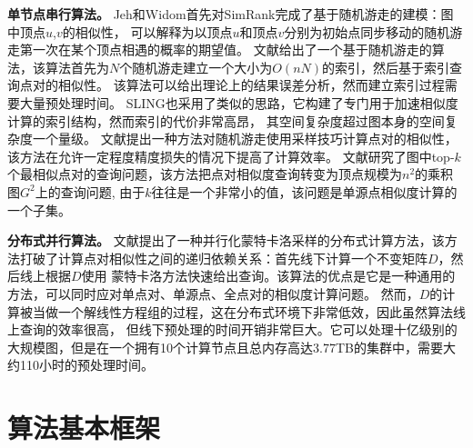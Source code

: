 \documentclass[master]{njuthesis}
\begin{document}
\textbf{单节点串行算法。 }Jeh和Widom\cite{jeh2002simrank}首先对SimRank完成了基于随机游走的建模：图中顶点$u$,$v$的相似性，
可以解释为以顶点$u$和顶点$v$分别为初始点同步移动的随机游走第一次在某个顶点相遇的概率的期望值。
文献\cite{fogaras2005scaling}给出了一个基于随机游走的算法，该算法首先为$N$个随机游走建立一个大小为$O(nN)$的索引，然后基于索引查询点对的相似性。
该算法可以给出理论上的结果误差分析，然而建立索引过程需要大量预处理时间。
SLING\cite{DBLP:conf/sigmod/TianX16}也采用了类似的思路，它构建了专门用于加速相似度计算的索引结构，然而索引的代价非常高昂，
其空间复杂度超过图本身的空间复杂度一个量级。
文献\cite{kusumoto2014scalable}提出一种方法对随机游走使用采样技巧计算点对的相似性，该方法在允许一定程度精度损失的情况下提高了计算效率。
文献\cite{lee2012top}研究了图中top-$k$个最相似点对的查询问题，该方法把点对相似度查询转变为顶点规模为$n^2$的乘积图$G^2$上的查询问题,
由于$k$往往是一个非常小的值，该问题是单源点相似度计算的一个子集。

\textbf{分布式并行算法。 }
文献\cite{DBLP:journals/pvldb/LiFLCCL15}提出了一种并行化蒙特卡洛采样的分布式计算方法，该方法打破了计算点对相似性之间的递归依赖关系：首先线下计算一个不变矩阵$D$，然后线上根据$D$使用
蒙特卡洛方法快速给出查询。该算法的优点是它是一种通用的方法，可以同时应对单点对、单源点、全点对的相似度计算问题。
然而，$D$的计算被当做一个解线性方程组的过程，这在分布式环境下非常低效，因此虽然算法线上查询的效率很高，
但线下预处理的时间开销非常巨大。它可以处理十亿级别的大规模图，但是在一个拥有10个计算节点且总内存高达3.77TB的集群中，需要大约110小时的预处理时间。
\section{算法基本框架}
\end{document}
